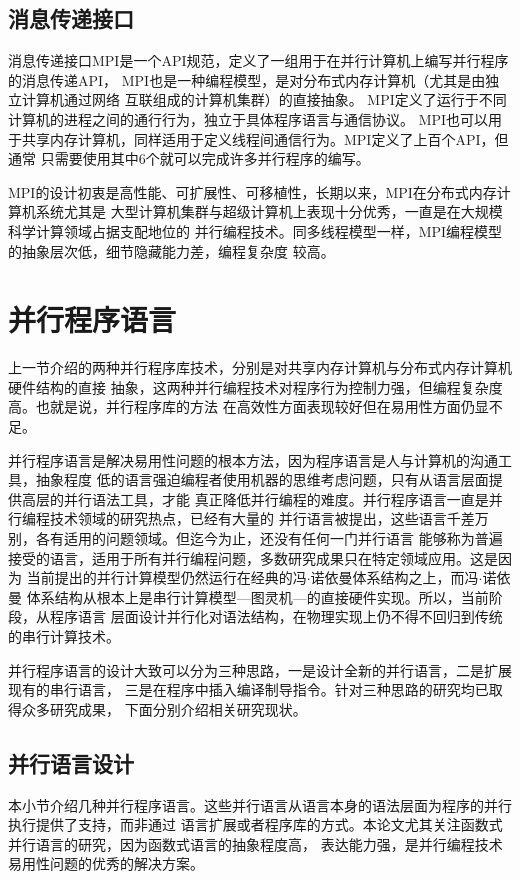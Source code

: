 \subsection{消息传递接口}
消息传递接口MPI是一个API规范，定义了一组用于在并行计算机上编写并行程序的消息传递API，
MPI也是一种编程模型，是对分布式内存计算机（尤其是由独立计算机通过网络
互联组成的计算机集群）的直接抽象。
MPI定义了运行于不同计算机的进程之间的通行行为，独立于具体程序语言与通信协议。
MPI也可以用于共享内存计算机，同样适用于定义线程间通信行为。MPI定义了上百个API，但通常
只需要使用其中6个就可以完成许多并行程序的编写。

MPI的设计初衷是高性能、可扩展性、可移植性，长期以来，MPI在分布式内存计算机系统尤其是
大型计算机集群与超级计算机上表现十分优秀，一直是在大规模科学计算领域占据支配地位的
并行编程技术。同多线程模型一样，MPI编程模型的抽象层次低，细节隐藏能力差，编程复杂度
较高。

\section{并行程序语言}
上一节介绍的两种并行程序库技术，分别是对共享内存计算机与分布式内存计算机硬件结构的直接
抽象，这两种并行编程技术对程序行为控制力强，但编程复杂度高。也就是说，并行程序库的方法
在高效性方面表现较好但在易用性方面仍显不足。

并行程序语言是解决易用性问题的根本方法，因为程序语言是人与计算机的沟通工具，抽象程度
低的语言强迫编程者使用机器的思维考虑问题，只有从语言层面提供高层的并行语法工具，才能
真正降低并行编程的难度。并行程序语言一直是并行编程技术领域的研究热点，已经有大量的
并行语言被提出，这些语言千差万别，各有适用的问题领域。但迄今为止，还没有任何一门并行语言
能够称为普遍接受的语言，适用于所有并行编程问题，多数研究成果只在特定领域应用。这是因为
当前提出的并行计算模型仍然运行在经典的冯$\cdot{}$诺依曼体系结构之上，而冯$\cdot{}$诺依曼
体系结构从根本上是串行计算模型---图灵机---的直接硬件实现。所以，当前阶段，从程序语言
层面设计并行化对语法结构，在物理实现上仍不得不回归到传统的串行计算技术。

并行程序语言的设计大致可以分为三种思路，一是设计全新的并行语言，二是扩展现有的串行语言，
三是在程序中插入编译制导指令。针对三种思路的研究均已取得众多研究成果，
下面分别介绍相关研究现状。

\subsection{并行语言设计}
本小节介绍几种并行程序语言。这些并行语言从语言本身的语法层面为程序的并行执行提供了支持，而非通过
语言扩展或者程序库的方式。本论文尤其关注函数式并行语言的研究，因为函数式语言的抽象程度高，
表达能力强，是并行编程技术易用性问题的优秀的解决方案。

